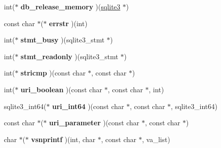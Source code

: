 \begin{DoxyCompactItemize}
\item 
\hypertarget{structsqlite3__api__routines_ae2363076a42752e78fbbd95df7d904f2}{int($\ast$ {\bfseries db\+\_\+release\+\_\+memory} )(\hyperlink{structsqlite3}{sqlite3} $\ast$)}\label{structsqlite3__api__routines_ae2363076a42752e78fbbd95df7d904f2}

\item 
\hypertarget{structsqlite3__api__routines_abe13e230a5758742b704f4361c20836c}{const char $\ast$($\ast$ {\bfseries errstr} )(int)}\label{structsqlite3__api__routines_abe13e230a5758742b704f4361c20836c}

\item 
\hypertarget{structsqlite3__api__routines_acb29457d970ab9854d35446f207933e4}{int($\ast$ {\bfseries stmt\+\_\+busy} )(sqlite3\+\_\+stmt $\ast$)}\label{structsqlite3__api__routines_acb29457d970ab9854d35446f207933e4}

\item 
\hypertarget{structsqlite3__api__routines_a6d2a2daec1f9215ac15ac9c941919248}{int($\ast$ {\bfseries stmt\+\_\+readonly} )(sqlite3\+\_\+stmt $\ast$)}\label{structsqlite3__api__routines_a6d2a2daec1f9215ac15ac9c941919248}

\item 
\hypertarget{structsqlite3__api__routines_a0e2d9055bbe019f4232902c413c240d5}{int($\ast$ {\bfseries stricmp} )(const char $\ast$, const char $\ast$)}\label{structsqlite3__api__routines_a0e2d9055bbe019f4232902c413c240d5}

\item 
\hypertarget{structsqlite3__api__routines_a5b22d69516c01562f7e5bfa61a5a09e4}{int($\ast$ {\bfseries uri\+\_\+boolean} )(const char $\ast$, const char $\ast$, int)}\label{structsqlite3__api__routines_a5b22d69516c01562f7e5bfa61a5a09e4}

\item 
\hypertarget{structsqlite3__api__routines_a03be0cdc22e246acc8c0fc15a7be4b24}{sqlite3\+\_\+int64($\ast$ {\bfseries uri\+\_\+int64} )(const char $\ast$, const char $\ast$, sqlite3\+\_\+int64)}\label{structsqlite3__api__routines_a03be0cdc22e246acc8c0fc15a7be4b24}

\item 
\hypertarget{structsqlite3__api__routines_a54befd2fff5d4cddcf2bdb05df470f9b}{const char $\ast$($\ast$ {\bfseries uri\+\_\+parameter} )(const char $\ast$, const char $\ast$)}\label{structsqlite3__api__routines_a54befd2fff5d4cddcf2bdb05df470f9b}

\item 
\hypertarget{structsqlite3__api__routines_ad1f8c7c0b8a41360b3da6238f169f2b9}{char $\ast$($\ast$ {\bfseries vsnprintf} )(int, char $\ast$, const char $\ast$, va\+\_\+list)}\label{structsqlite3__api__routines_ad1f8c7c0b8a41360b3da6238f169f2b9}


\end{DoxyCompactItemize}
